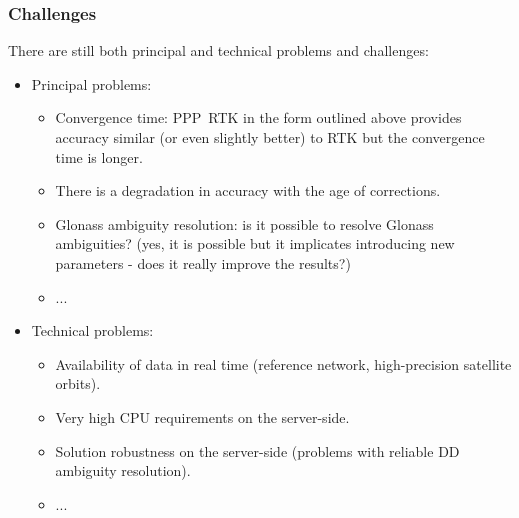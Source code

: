 \documentclass[10pt]{beamer}
\begin{document}

\begin{frame}
  \frametitle{Challenges}
  There are still both principal and technical problems and challenges:
  \begin{itemize}
  \item Principal problems:
    \begin{itemize}
    \item Convergence time: PPP~RTK in the form outlined above provides
      accuracy similar (or even slightly better) to RTK but the convergence
      time is longer.
    \item There is a degradation in accuracy with the age of corrections.
    \item Glonass ambiguity resolution: is it possible to resolve Glonass
      ambiguities? (yes, it is possible but it implicates introducing new
      parameters - does it really improve the results?)
    \item ...
    \end{itemize}
  \item Technical problems:
    \begin{itemize}
    \item Availability of data in real time (reference network, high-precision
          satellite orbits).
    \item Very high CPU requirements on the server-side.
    \item Solution robustness on the server-side 
          (problems with reliable DD ambiguity resolution). 
    \item ...
    \end{itemize}
  \end{itemize}
\end{frame}

\end{document}
